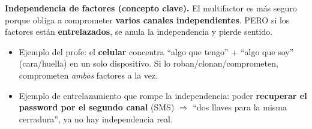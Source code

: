 \documentclass[../main.tex]{subfiles}
\begin{document}
\begin{examen}
\textbf{Independencia de factores (concepto clave).} El multifactor es más seguro porque obliga a comprometer \textbf{varios canales independientes}. PERO si los factores están \textbf{entrelazados}, se anula la independencia y pierde sentido.
\begin{itemize}[itemsep=1pt]
  \item Ejemplo del profe: el \textbf{celular} concentra ``algo que tengo'' + ``algo que soy'' (cara/huella) en un solo dispositivo. Si lo roban/clonan/comprometen, comprometen \emph{ambos} factores a la vez.
  \item Ejemplo de entrelazamiento que rompe la independencia: poder \textbf{recuperar el password por el segundo canal} (SMS) $\Rightarrow$ ``dos llaves para la misma cerradura'', ya no hay independencia real.
\end{itemize}
\end{examen}
\end{document}

